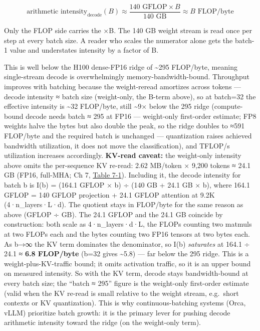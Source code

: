 \[
\text{arithmetic intensity}_{\text{decode}}(B) \approx \frac{140 \text{ GFLOP} \times B}{140 \text{ GB}} \approx B \text{ FLOP/byte}
\]

Only the FLOP side carries the ×B. The 140 GB weight stream is read once
per step at every batch size. A reader who scales the numerator alone
gets the batch-1 value and understates intensity by a factor of B.

This is well below the H100 dense-FP16 ridge of \textasciitilde295
FLOP/byte, meaning single-stream decode is overwhelmingly
memory-bandwidth-bound. Throughput improves with batching because the
weight-reread amortizes across tokens --- decode intensity ≈ batch size
(weight-only, the B-term above), so at batch=32 the effective intensity
is \textasciitilde32 FLOP/byte, still \textasciitilde9× below the 295
ridge (compute-bound decode needs batch ≈ 295 at FP16 --- weight-only
first-order estimate; FP8 weights halve the bytes but also double the
peak, so the ridge doubles to ≈591 FLOP/byte and the required batch is
unchanged --- quantization raises achieved bandwidth utilization, it
does not move the classification), and TFLOP/s utilization increases
accordingly. \textbf{KV-read caveat:} the weight-only intensity above
omits the per-sequence KV re-read: 2.62 MB/token × 9,200 tokens ≈ 24.1
GB (FP16, full-MHA; Ch 7, \hyperref[tab:7.1]{Table 7-1}). Including it, the decode intensity
for batch b is I(b) = (164.1 GFLOP × b) ÷ (140 GB + 24.1 GB × b), where
164.1 GFLOP = 140 GFLOP projection + 24.1 GFLOP attention at 9.2K
(4·n\_layers·L·d). The quotient stays in FLOP/byte for the same reason
as above (GFLOP ÷ GB). The 24.1 GFLOP and the 24.1 GB coincide by
construction: both scale as 4·n\_layers·d·L, the FLOPs counting two
matmuls at two FLOPs each and the bytes counting two FP16 tensors at two
bytes each. As b→∞ the KV term dominates the denominator, so I(b)
\emph{saturates} at 164.1 ÷ 24.1 ≈ \textbf{6.8 FLOP/byte} (b=32 gives
\textasciitilde5.8) --- far below the 295 ridge. This is a
weight-plus-KV-traffic bound; it omits activation traffic, so it is an
upper bound on measured intensity. So with the KV term, decode stays
bandwidth-bound at every batch size; the ``batch ≈ 295'' figure is the
weight-only first-order estimate (valid when the KV re-read is small
relative to the weight stream, e.g.~short contexts or KV quantization).
This is why continuous-batching systems (Orca, vLLM) prioritize batch
growth: it is the primary lever for pushing decode arithmetic intensity
toward the ridge (on the weight-only term).

